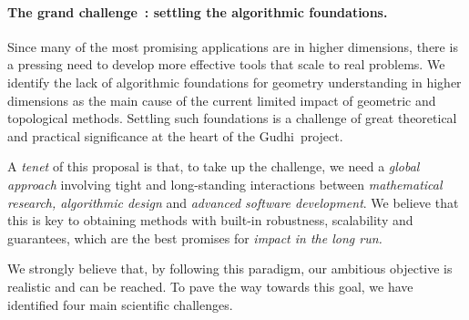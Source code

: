 


\vspace{-3mm}

\paragraph{The grand challenge~: settling the algorithmic foundations.}
Since many of the most promising applications are in higher dimensions, there is a pressing need to develop more effective tools that scale to real problems.  We identify the lack of  algorithmic foundations for geometry understanding in higher dimensions as 
the main cause of the current limited impact of geometric and topological methods.  Settling such foundations
is a challenge of great theoretical and practical significance at the heart of the Gudhi~project.


A {\em tenet} of this proposal is that, to take up the challenge, we need a {\em global approach} involving tight and long-standing interactions between {\em mathematical research, algorithmic design} and {\em advanced software development}. We believe that this is key to obtaining methods with built-in robustness, scalability and guarantees, which are the best promises for {\em impact in the long run.}

We strongly believe that, by following this paradigm,  our ambitious objective is realistic and can be reached. To pave the way towards this goal, we have identified  four main scientific challenges.


